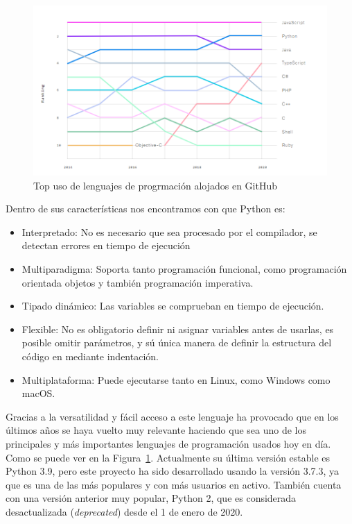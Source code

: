 \documentclass[a4paper, 12pt]{book}
\begin{document}
\begin{figure}
	\centering
	\includegraphics[width=18cm]{img/top_programing_languajes.png}
	\caption{Top uso de lenguajes de progrmación alojados en GitHub}
	\label{fig:Top_programming}
\end{figure}

Dentro de sus características nos encontramos con que Python es: 
\begin{itemize}
	\item Interpretado: No es necesario que sea procesado por el compilador, se detectan errores en tiempo de ejecución 
	\item Multiparadigma: Soporta tanto programación funcional, como programación orientada objetos y también programación imperativa.  
	\item Tipado dinámico: Las variables se comprueban en tiempo de ejecución. 
	\item Flexible: No es obligatorio definir ni asignar variables antes de usarlas, es posible omitir parámetros, y sú única manera de definir la estructura del código en mediante indentación.
	\item Multiplataforma: Puede ejecutarse tanto en Linux, como Windows como macOS. 
\end{itemize}


Gracias a la versatilidad y fácil acceso a este lenguaje ha provocado que en los últimos años se haya vuelto muy relevante haciendo que sea uno de los principales y más importantes lenguajes de programación usados hoy en día. Como se puede ver en la Figura~\ref{fig:Top_programming}.
Actualmente su última versión estable es Python 3.9, pero este proyecto ha sido desarrollado usando la versión 3.7.3, ya que es una de las más populares y con más usuarios en activo. También cuenta con una versión anterior muy popular, Python 2, que es considerada desactualizada (\emph{deprecated}) desde el 1 de enero de 2020. 
\end{document}
